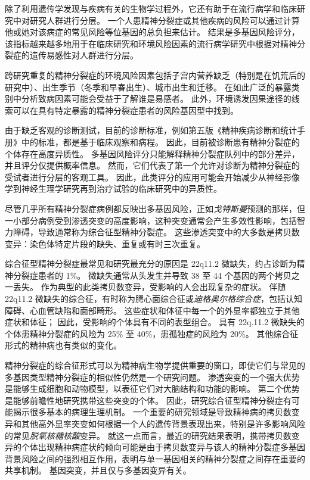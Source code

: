 除了利用遗传学发现与疾病有关的生物学过程外，它还有助于在流行病学和临床研究中对研究人群进行分层。
一个人患精神分裂症或其他疾病的风险可以通过计算他或她对该病症的常见风险等位基因的总负担来估计。
结果是多基因风险评分，该指标越来越多地用于在临床研究和环境风险因素的流行病学研究中根据对精神分裂症的遗传易感性对人群进行分层。


跨研究重复的精神分裂症的环境风险因素包括子宫内营养缺乏（特别是在饥荒后的研究中）、出生季节（冬季和早春出生）、城市出生和迁移。
在如此广泛的暴露类别中分析致病因素可能会受益于了解谁是易感者。
此外，环境诱发因果途径的线索可以在具有特定暴露的精神分裂症患者的风险基因型中找到。


由于缺乏客观的诊断测试，目前的诊断标准，例如第五版《精神疾病诊断和统计手册》中的标准，都是基于临床观察和病程。
因此，目前被诊断患有精神分裂症的个体存在高度异质性。
多基因风险评分只能解释精神分裂症队列中的部分差异，并且评分仅提供概率信息。
然而，它们代表了第一个允许对诊断为精神分裂症的受试者进行分层的客观工具。
因此，此类评分的应用可能会开始减少从神经影像学到神经生理学研究再到治疗试验的临床研究中的异质性。


尽管几乎所有精神分裂症病例都反映出多基因风险，正如\textit{戈特斯曼}预测的那样，但一小部分病例受到渗透突变的高度影响，这种突变通常会产生多效性影响，包括智力障碍，导致通常称为综合征型精神分裂症。
这些渗透突变中的大多数是拷贝数变异：染色体特定片段的缺失、重复或有时三次重复。


综合征型精神分裂症最常见和研究最充分的原因是 22q11.2 微缺失，约占诊断为精神分裂症患者的 1\%。
微缺失通常从头发生并导致 38 至 44 个基因的两个拷贝之一丢失。
作为典型的此类拷贝数变异，受影响的人会出现复杂的症状。
伴随 22q11.2 微缺失的综合征，有时称为腭心面综合征或\textit{迪格奥尔格综合症}，包括认知障碍、心血管缺陷和面部畸形。
这些症状和体征中每一个的外显率都独立于其他症状和体征；
因此，受影响的个体具有不同的表型组合。
具有 22q.11.2 微缺失的个体患精神分裂症的风险为 25\% 至 40\%，患孤独症的风险为 20\%。
其他综合征形式的精神病也有类似的变化。


精神分裂症的综合征形式可以为精神病生物学提供重要的窗口，即使它们与常见的多基因类型精神分裂症的相似性仍然是一个研究问题。
渗透突变的一个强大优势是能够生成细胞和动物模型，以表征它们对大脑结构和功能的影响。
第二个优势是能够前瞻性地研究携带这些突变的个体。
因此，研究综合征型精神分裂症有可能揭示很多基本的病理生理机制。
一个重要的研究领域是导致精神病的拷贝数变异和其他高外显率突变如何根据一个人的遗传背景表现出来，特别是许多影响风险的常见\textit{脱氧核糖核酸}变异。
就这一点而言，最近的研究结果表明，携带拷贝数变异的个体出现精神病症状的倾向可能是由于拷贝数变异与该人的精神分裂症多基因背景风险之间的强烈相互作用，表明与单一基因相关的精神分裂症之间存在重要的共享机制。
基因突变，并且仅与多基因变异有关。



